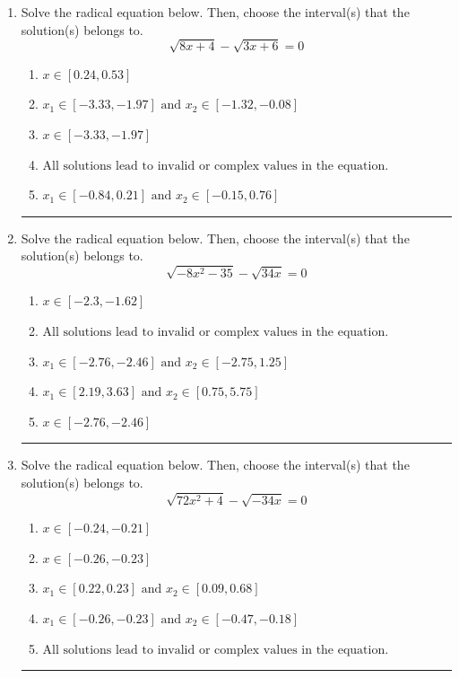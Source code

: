 \documentclass[14pt]{extbook}
\newcommand{\litem}[1]{\item#1\hspace*{-1cm}\rule{\textwidth}{0.4pt}}
\begin{document}
\begin{enumerate}
\litem{
Solve the radical equation below. Then, choose the interval(s) that the solution(s) belongs to.\[ \sqrt{8 x + 4} - \sqrt{3 x + 6} = 0 \]\begin{enumerate}[label=\Alph*.]
\item \( x \in [0.24,0.53] \)
\item \( x_1 \in [-3.33, -1.97] \text{ and } x_2 \in [-1.32,-0.08] \)
\item \( x \in [-3.33,-1.97] \)
\item \( \text{All solutions lead to invalid or complex values in the equation.} \)
\item \( x_1 \in [-0.84, 0.21] \text{ and } x_2 \in [-0.15,0.76] \)

\end{enumerate} }
\litem{
Solve the radical equation below. Then, choose the interval(s) that the solution(s) belongs to.\[ \sqrt{-8 x^2 - 35} - \sqrt{34 x} = 0 \]\begin{enumerate}[label=\Alph*.]
\item \( x \in [-2.3,-1.62] \)
\item \( \text{All solutions lead to invalid or complex values in the equation.} \)
\item \( x_1 \in [-2.76, -2.46] \text{ and } x_2 \in [-2.75,1.25] \)
\item \( x_1 \in [2.19, 3.63] \text{ and } x_2 \in [0.75,5.75] \)
\item \( x \in [-2.76,-2.46] \)

\end{enumerate} }
\litem{
Solve the radical equation below. Then, choose the interval(s) that the solution(s) belongs to.\[ \sqrt{72 x^2 + 4} - \sqrt{-34 x} = 0 \]\begin{enumerate}[label=\Alph*.]
\item \( x \in [-0.24,-0.21] \)
\item \( x \in [-0.26,-0.23] \)
\item \( x_1 \in [0.22, 0.23] \text{ and } x_2 \in [0.09,0.68] \)
\item \( x_1 \in [-0.26, -0.23] \text{ and } x_2 \in [-0.47,-0.18] \)
\item \( \text{All solutions lead to invalid or complex values in the equation.} \)


\end{enumerate}}
\end{enumerate}
\end{document}
